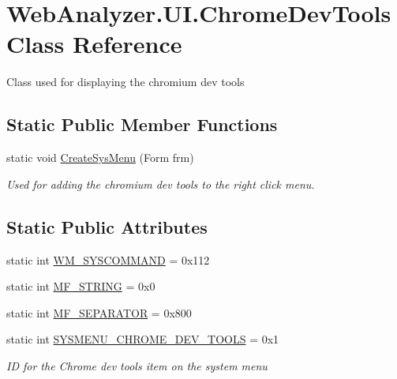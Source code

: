 \hypertarget{class_web_analyzer_1_1_u_i_1_1_chrome_dev_tools}{}\section{Web\+Analyzer.\+U\+I.\+Chrome\+Dev\+Tools Class Reference}
\label{class_web_analyzer_1_1_u_i_1_1_chrome_dev_tools}


Class used for displaying the chromium dev tools  


\subsection*{Static Public Member Functions}
\begin{DoxyCompactItemize}
\item 
static void \hyperlink{class_web_analyzer_1_1_u_i_1_1_chrome_dev_tools_a5b1875fb369de2a349c85c682c6b924d}{Create\+Sys\+Menu} (Form frm)
\begin{DoxyCompactList}\small\item\em Used for adding the chromium dev tools to the right click menu. \end{DoxyCompactList}\end{DoxyCompactItemize}
\subsection*{Static Public Attributes}
\begin{DoxyCompactItemize}
\item 
static int \hyperlink{class_web_analyzer_1_1_u_i_1_1_chrome_dev_tools_a4e5a194cb8f1eb30877f810655d14f6f}{W\+M\+\_\+\+S\+Y\+S\+C\+O\+M\+M\+A\+N\+D} = 0x112
\item 
static int \hyperlink{class_web_analyzer_1_1_u_i_1_1_chrome_dev_tools_a244dc36662bbe1c31e4d104e1e9cfa30}{M\+F\+\_\+\+S\+T\+R\+I\+N\+G} = 0x0
\item 
static int \hyperlink{class_web_analyzer_1_1_u_i_1_1_chrome_dev_tools_ac94ae0f0342e7cf49ae9b781e72a2e34}{M\+F\+\_\+\+S\+E\+P\+A\+R\+A\+T\+O\+R} = 0x800
\item 
static int \hyperlink{class_web_analyzer_1_1_u_i_1_1_chrome_dev_tools_a732c882f4d627f0aae88b1a38ddf03d2}{S\+Y\+S\+M\+E\+N\+U\+\_\+\+C\+H\+R\+O\+M\+E\+\_\+\+D\+E\+V\+\_\+\+T\+O\+O\+L\+S} = 0x1
\begin{DoxyCompactList}\small\item\em I\+D for the Chrome dev tools item on the system menu \end{DoxyCompactList}\end{DoxyCompactItemize}
